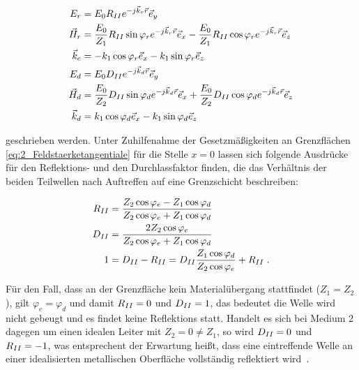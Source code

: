 \begin{align}
    E_r &= E_0 R_{\uproman{2}} e^{-j\vec k_r \vec r} \vec e_y \\
    \vec H_r &= \frac{E_0}{Z_1} R_{\uproman{2}} \sin{\varphi_r} e^{-j \vec k_r \vec r} \vec e_x - \frac{E_0}{Z_1} R_{\uproman{2}} \cos{\varphi_r} e^{-j \vec k_r \vec r} \vec e_z \\
    \vec k_e &= - k_1 \cos{\varphi_r} \vec e_x - k_1 \sin{\varphi_r} \vec e_z \\
    E_d &= E_0 D_{\uproman{2}} e^{-j\vec k_d \vec r} \vec e_y \\
    \vec H_d &= \frac{E_0}{Z_2} D_{\uproman{2}} \sin{\varphi_d} e^{-j \vec k_d \vec r} \vec e_x + \frac{E_0}{Z_2} D_{\uproman{2}} \cos{\varphi_d} e^{-j \vec k_d \vec r} \vec e_z \\
    \vec k_d &= k_1 \cos{\varphi_d} \vec e_x - k_1 \sin{\varphi_d} \vec e_z
\end{align}

geschrieben werden. Unter Zuhilfenahme der Gesetzmäßigkeiten an Grenzflächen \Gleichungen \eqref{eq:2_Feldstaerketangentiale} für die Stelle $x=0$ lassen sich folgende Ausdrücke für den Reflektions- und den Durchlassfaktor finden, die das Verhältnis der beiden Teilwellen nach Auftreffen auf eine Grenzschicht beschreiben:

\begin{align}
    R_{\uproman{2}} &= \frac{Z_2 \cos{\varphi_e} - Z_1 \cos{\varphi_d}}{Z_2 \cos{\varphi_e} + Z_1 \cos{\varphi_d}} \\
    D_{\uproman{2}} &= \frac{2 Z_2 \cos{\varphi_e}}{Z_2 \cos{\varphi_e} + Z_1 \cos{\varphi_d}} \\ 
    1 &= D_{\uproman{2}} - R_{\uproman{2}} = D_{\uproman{2}} \frac{Z_1 \cos{\varphi_d}}{Z_2 \cos{\varphi_e}} + R_{\uproman{2}} \; .
\end{align}

Für den Fall, dass an der Grenzfläche kein Materialübergang stattfindet ($Z_1 = Z_2$), gilt $\varphi_e = \varphi_d$ und damit $R_{\uproman{2}} = 0$ und $D_{\uproman{2}} = 1$, das bedeutet die Welle wird nicht gebeugt und es findet keine Reflektions statt. Handelt es sich bei Medium 2 dagegen um einen idealen Leiter mit $Z_2 = 0 \neq Z_1$, so wird $D_{\uproman{2}} = 0$ und $R_{\uproman{2}} = -1$, was entsprechent der Erwartung heißt, dass eine eintreffende Welle an einer idealisierten metallischen Oberfläche vollständig reflektiert wird~\cite{EM_Schirmung}. 






